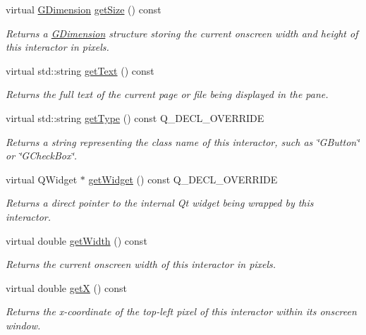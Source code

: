 \begin{DoxyCompactItemize}
virtual \mbox{\hyperlink{classGDimension}{G\+Dimension}} \mbox{\hyperlink{classGInteractor_a7b4eec96a2bdc6420695d5796a78eea9}{get\+Size}} () const
\begin{DoxyCompactList}\small\item\em Returns a \mbox{\hyperlink{classGDimension}{G\+Dimension}} structure storing the current onscreen width and height of this interactor in pixels. \end{DoxyCompactList}\item 
virtual std\+::string \mbox{\hyperlink{classGBrowserPane_aff553c50924b836c29f146ed34a7c6ec}{get\+Text}} () const
\begin{DoxyCompactList}\small\item\em Returns the full text of the current page or file being displayed in the pane. \end{DoxyCompactList}\item 
virtual std\+::string \mbox{\hyperlink{classGBrowserPane_a9896d58fcfebbf1025aeeb5b8b9ede80}{get\+Type}} () const Q\+\_\+\+D\+E\+C\+L\+\_\+\+O\+V\+E\+R\+R\+I\+DE
\begin{DoxyCompactList}\small\item\em Returns a string representing the class name of this interactor, such as \char`\"{}\+G\+Button\char`\"{} or \char`\"{}\+G\+Check\+Box\char`\"{}. \end{DoxyCompactList}\item 
virtual Q\+Widget $\ast$ \mbox{\hyperlink{classGBrowserPane_a326ee51b5561f807df7b29a1c101f7fd}{get\+Widget}} () const Q\+\_\+\+D\+E\+C\+L\+\_\+\+O\+V\+E\+R\+R\+I\+DE
\begin{DoxyCompactList}\small\item\em Returns a direct pointer to the internal Qt widget being wrapped by this interactor. \end{DoxyCompactList}\item 
virtual double \mbox{\hyperlink{classGInteractor_a0ed2965abd4f5701d2cadf71239faf19}{get\+Width}} () const
\begin{DoxyCompactList}\small\item\em Returns the current onscreen width of this interactor in pixels. \end{DoxyCompactList}\item 
virtual double \mbox{\hyperlink{classGInteractor_a344385751bee0720059403940d57a13e}{getX}} () const
\begin{DoxyCompactList}\small\item\em Returns the x-\/coordinate of the top-\/left pixel of this interactor within its onscreen window. \end{DoxyCompactList}\item 

\end{DoxyCompactItemize}
